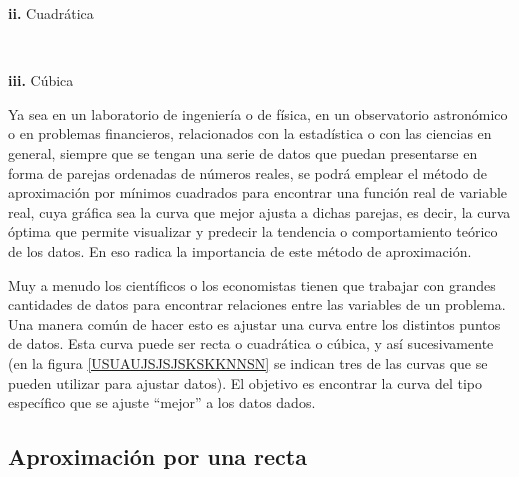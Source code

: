 {\begin{center}
\begin{tikzpicture}
    \end{tikzpicture}
    \textbf{ii.} Cuadrática
\end{center}
~\vspace{-0.5cm}
\begin{center}
    \textbf{iii.} Cúbica
\end{center}
}

Ya sea en un laboratorio de ingeniería o de física, en un observatorio astronómico o en problemas financieros, relacionados con la estadística o con las ciencias en general, siempre que se tengan una serie de datos que puedan presentarse en forma de parejas ordenadas de números reales, se podrá emplear el método de aproximación por mínimos cuadrados para encontrar una función real de variable real, cuya gráfica sea la curva que mejor ajusta a dichas parejas, es decir, la curva óptima que permite visualizar y predecir la tendencia o comportamiento teórico de los datos. En eso radica la importancia de este método de aproximación.

Muy a menudo los científicos o los economistas tienen que trabajar con grandes cantidades de datos para encontrar relaciones entre las variables de un problema. Una manera común de hacer esto es ajustar una curva entre los distintos puntos de datos. Esta curva puede ser recta o cuadrática o cúbica, y así sucesivamente (en la figura \ref{USUAUJSJSJSKSKKNNSN} se indican tres de las curvas que se pueden utilizar para ajustar datos). El objetivo es encontrar la curva del tipo específico que se ajuste “mejor” a los datos dados.

\subsection*{Aproximación por una recta}

